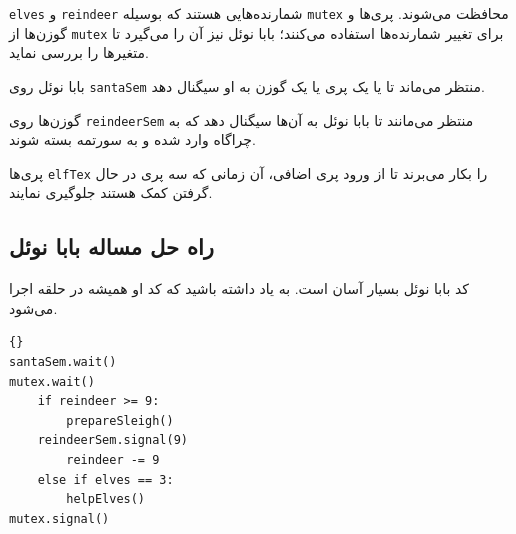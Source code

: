 \documentclass{book}
\newcommand{\clearemptydoublepage}{\newpage\cleardoublepage}
\begin{document}
    {\tt elves} و {\tt reindeer} شمارنده‌هایی هستند که بوسیله {\tt mutex} محافظت می‌شوند. 
    پری‌ها و گوزن‌‌ها از {\tt mutex} برای تغییر شمارنده‌ها استفاده می‌کنند؛‌ بابا نوئل نیز آن را می‌گیرد تا متغیرها را بررسی نماید.

    بابا نوئل روی  {\tt santaSem} منتظر می‌ماند تا یا یک پری یا یک گوزن به او سیگنال دهد. 

    گوزن‌ها روی {\tt reindeerSem} منتظر می‌مانند تا بابا نوئل به آن‌ها سیگنال دهد که به چراگاه وارد شده و به سورتمه بسته شوند. 

    پری‌ها {\tt elfTex} را بکار می‌برند تا از ورود پری اضافی، آن زمانی که سه پری در حال گرفتن کمک هستند جلوگیری نمایند. 


\clearemptydoublepage
\subsection{راه حل مساله بابا نوئل}

    کد بابا نوئل بسیار آسان است. به یاد داشته باشید که کد او همیشه در حلقه اجرا می‌شود. 

\begin{latin}
\begin{latin}
\begin{lstlisting}[title=\rl{راه حل مساله بابا نوئل (بابا نوئل)}]{}
santaSem.wait()
mutex.wait()
    if reindeer >= 9:
        prepareSleigh()
	reindeerSem.signal(9)
        reindeer -= 9
    else if elves == 3:
        helpElves()
mutex.signal()
\end{lstlisting}
\end{latin}
\end{latin}
\end{document}
